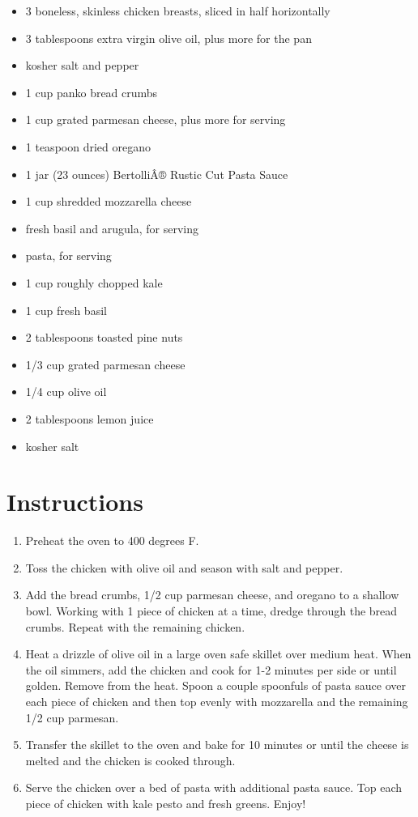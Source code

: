 \documentclass[
  letterpaper,
  DIV=11,
  numbers=noendperiod,
  titlepage=false]{scrreprt}
\providecommand{\tightlist}{%
  \setlength{\itemsep}{0pt}\setlength{\parskip}{0pt}}\usepackage{longtable,booktabs,array}
\begin{document}
\begin{itemize}
\tightlist
\item
  3 boneless, skinless chicken breasts, sliced in half horizontally
\item
  3 tablespoons extra virgin olive oil, plus more for the pan
\item
  kosher salt and pepper
\item
  1 cup panko bread crumbs
\item
  1 cup grated parmesan cheese, plus more for serving
\item
  1 teaspoon dried oregano
\item
  1 jar (23 ounces) BertolliÂ® Rustic Cut Pasta Sauce
\item
  1 cup shredded mozzarella cheese
\item
  fresh basil and arugula, for serving
\item
  pasta, for serving
\item
  1 cup roughly chopped kale
\item
  1 cup fresh basil
\item
  2 tablespoons toasted pine nuts
\item
  1/3 cup grated parmesan cheese
\item
  1/4 cup olive oil
\item
  2 tablespoons lemon juice
\item
  kosher salt
\end{itemize}

\section{Instructions}\label{instructions-14}

\begin{enumerate}
\def\labelenumi{\arabic{enumi}.}
\tightlist
\item
  Preheat the oven to 400 degrees F.
\item
  Toss the chicken with olive oil and season with salt and pepper.
\item
  Add the bread crumbs, 1/2 cup parmesan cheese, and oregano to a
  shallow bowl. Working with 1 piece of chicken at a time, dredge
  through the bread crumbs. Repeat with the remaining chicken.
\item
  Heat a drizzle of olive oil in a large oven safe skillet over medium
  heat. When the oil simmers, add the chicken and cook for 1-2 minutes
  per side or until golden. Remove from the heat. Spoon a couple
  spoonfuls of pasta sauce over each piece of chicken and then top
  evenly with mozzarella and the remaining 1/2 cup parmesan.
\item
  Transfer the skillet to the oven and bake for 10 minutes or until the
  cheese is melted and the chicken is cooked through.
\item
  Serve the chicken over a bed of pasta with additional pasta sauce. Top
  each piece of chicken with kale pesto and fresh greens. Enjoy!
\end{enumerate}
\end{document}
